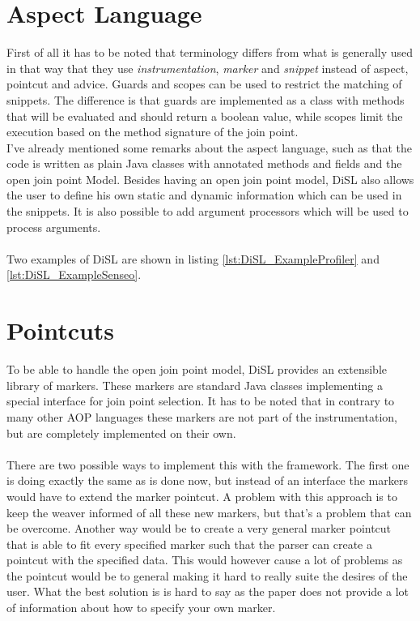 \documentclass[a4paper]{report}
\begin{document}
\section{Aspect Language}
First of all it has to be noted that terminology differs from what is generally used in that way that they use \textit{instrumentation}, \textit{marker} and \textit{snippet} instead of aspect, pointcut and advice. Guards and scopes can be used to restrict the matching of snippets. The difference is that guards are implemented as a class with methods that will be evaluated and should return a boolean value, while scopes limit the execution based on the method signature of the join point.
\\
I've already mentioned some remarks about the aspect language, such as that the code is written as plain Java classes with annotated methods and fields and the open join point Model. Besides having an open join point model, DiSL also allows the user to define his own static and dynamic information which can be used in the snippets. It is also possible to add argument processors which will be used to process arguments.\\
\\
Two examples of DiSL are shown in listing \ref{lst:DiSL_ExampleProfiler} and \ref{lst:DiSL_ExampleSenseo}.

\section{Pointcuts}
To be able to handle the open join point model, DiSL provides an extensible library of markers. These markers are standard Java classes implementing a special interface for join point selection. It has to be noted that in contrary to many other AOP languages these markers are not part of the instrumentation, but are completely implemented on their own.\\
\\
There are two possible ways to implement this with the framework. The first one is doing exactly the same as is done now, but instead of an interface the markers would have to extend the marker pointcut. A problem with this approach is to keep the weaver informed of all these new markers, but that's a problem that can be overcome. Another way would be to create a very general marker pointcut that is able to fit every specified marker such that the parser can create a pointcut with the specified data. This would however cause a lot of problems as the pointcut would be to general making it hard to really suite the desires of the user. What the best solution is is hard to say as the paper does not provide a lot of information about how to specify your own marker.
\end{document}
